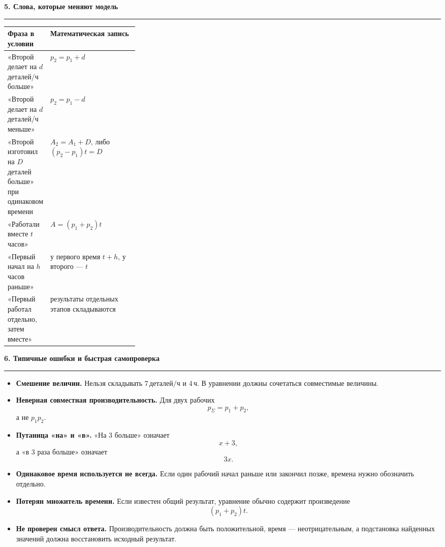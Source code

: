\documentclass[a4paper,12pt]{article}
\newcommand{\lessonsection}[1]{%
  \vspace{0.35em}
  {\Large\bfseries\textcolor{darkaccent}{#1}}\par
  \vspace{0.2em}
  {\color{accent}\rule{\linewidth}{0.6pt}}\par
  \vspace{0.4em}
}
\newcommand{\unit}[1]{\,\text{#1}}
\begin{document}
\lessonsection{5. Слова, которые меняют модель}

\begin{center}
\begin{tabularx}{\linewidth}{@{}p{0.30\linewidth}X@{}}
\toprule
\textbf{Фраза в условии} & \textbf{Математическая запись} \\
\midrule

«Второй делает на $d$ деталей/ч больше»
&
$p_2=p_1+d$
\\

«Второй делает на $d$ деталей/ч меньше»
&
$p_2=p_1-d$
\\

«Второй изготовил на $D$ деталей больше»
при одинаковом времени
&
$A_2=A_1+D$,
либо
$(p_2-p_1)t=D$
\\

«Работали вместе $t$ часов»
&
$A=(p_1+p_2)t$
\\

«Первый начал на $h$ часов раньше»
&
у первого время $t+h$,
у второго --- $t$
\\

«Первый работал отдельно, затем вместе»
&
результаты отдельных этапов складываются
\\

\bottomrule
\end{tabularx}
\end{center}

\lessonsection{6. Типичные ошибки и быстрая самопроверка}

\begin{itemize}

  \item
  \textbf{Смешение величин.}
  Нельзя складывать
  $7\unit{деталей/ч}$ и $4\unit{ч}$.
  В уравнении должны сочетаться совместимые величины.

  \item
  \textbf{Неверная совместная производительность.}
  Для двух рабочих
  \[
  p_{\Sigma}=p_1+p_2,
  \]
  а не $p_1p_2$.

  \item
  \textbf{Путаница «на» и «в».}
  «На $3$ больше» означает
  \[
  x+3,
  \]
  а «в $3$ раза больше» означает
  \[
  3x.
  \]

  \item
  \textbf{Одинаковое время используется не всегда.}
  Если один рабочий начал раньше или закончил позже,
  времена нужно обозначить отдельно.

  \item
  \textbf{Потерян множитель времени.}
  Если известен общий результат,
  уравнение обычно содержит произведение
  \[
  (p_1+p_2)t.
  \]

  \item
  \textbf{Не проверен смысл ответа.}
  Производительность должна быть положительной,
  время --- неотрицательным,
  а подстановка найденных значений должна
  восстановить исходный результат.

\end{itemize}
\end{document}
